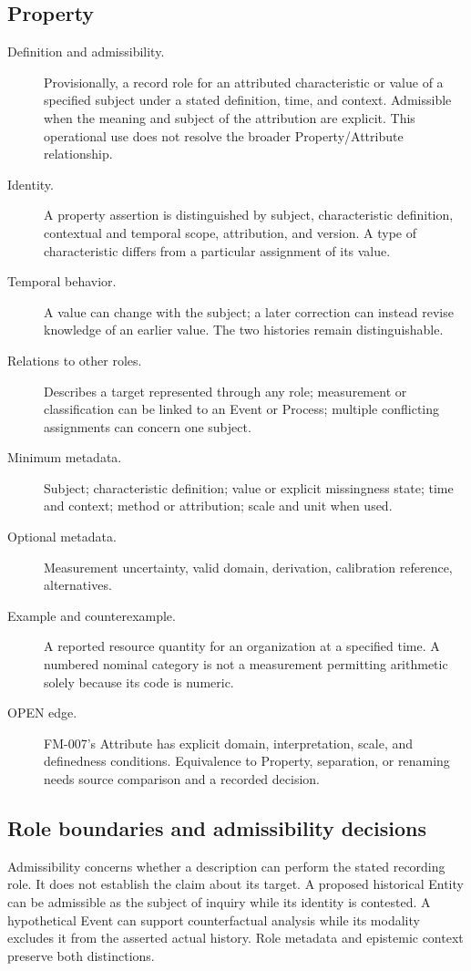 \documentclass[11pt,a4paper]{article}
\begin{document}
\subsection{Property}
\begin{description}
\item[Definition and admissibility.] Provisionally, a record role for an attributed characteristic or value of a specified subject under a stated definition, time, and context. Admissible when the meaning and subject of the attribution are explicit. This operational use does not resolve the broader Property/Attribute relationship.
\item[Identity.] A property assertion is distinguished by subject, characteristic definition, contextual and temporal scope, attribution, and version. A type of characteristic differs from a particular assignment of its value.
\item[Temporal behavior.] A value can change with the subject; a later correction can instead revise knowledge of an earlier value. The two histories remain distinguishable.
\item[Relations to other roles.] Describes a target represented through any role; measurement or classification can be linked to an Event or Process; multiple conflicting assignments can concern one subject.
\item[Minimum metadata.] Subject; characteristic definition; value or explicit missingness state; time and context; method or attribution; scale and unit when used.
\item[Optional metadata.] Measurement uncertainty, valid domain, derivation, calibration reference, alternatives.
\item[Example and counterexample.] A reported resource quantity for an organization at a specified time. A numbered nominal category is not a measurement permitting arithmetic solely because its code is numeric.
\item[OPEN edge.] FM-007's Attribute has explicit domain, interpretation, scale, and definedness conditions. Equivalence to Property, separation, or renaming needs source comparison and a recorded decision.
\end{description}


\subsection{Role boundaries and admissibility decisions}
Admissibility concerns whether a description can perform the stated recording role. It does not establish the claim about its target. A proposed historical Entity can be admissible as the subject of inquiry while its identity is contested. A hypothetical Event can support counterfactual analysis while its modality excludes it from the asserted actual history. Role metadata and epistemic context preserve both distinctions.
\end{document}
